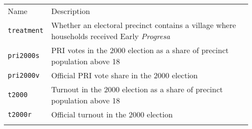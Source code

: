 \documentclass[]{article}
\begin{document}
\begin{longtable}[c]{@{}ll@{}}
\toprule\addlinespace
\begin{minipage}[b]{0.25\columnwidth}\raggedright
Name
\end{minipage} & \begin{minipage}[b]{0.68\columnwidth}\raggedright
Description
\end{minipage}
\\\addlinespace
\midrule\endhead
\begin{minipage}[t]{0.25\columnwidth}\raggedright
\texttt{treatment}
\end{minipage} & \begin{minipage}[t]{0.68\columnwidth}\raggedright
Whether an electoral precinct contains a village where households
received Early \emph{Progresa}
\end{minipage}
\\\addlinespace
\begin{minipage}[t]{0.25\columnwidth}\raggedright
\texttt{pri2000s}
\end{minipage} & \begin{minipage}[t]{0.68\columnwidth}\raggedright
PRI votes in the 2000 election as a share of precinct population above
18
\end{minipage}
\\\addlinespace
\begin{minipage}[t]{0.25\columnwidth}\raggedright
\texttt{pri2000v}
\end{minipage} & \begin{minipage}[t]{0.68\columnwidth}\raggedright
Official PRI vote share in the 2000 election
\end{minipage}
\\\addlinespace
\begin{minipage}[t]{0.25\columnwidth}\raggedright
\texttt{t2000}
\end{minipage} & \begin{minipage}[t]{0.68\columnwidth}\raggedright
Turnout in the 2000 election as a share of precinct population above 18
\end{minipage}
\\\addlinespace
\begin{minipage}[t]{0.25\columnwidth}\raggedright
\texttt{t2000r}
\end{minipage} & \begin{minipage}[t]{0.68\columnwidth}\raggedright
Official turnout in the 2000 election
\end{minipage}
\\\addlinespace

\end{longtable}
\end{document}
